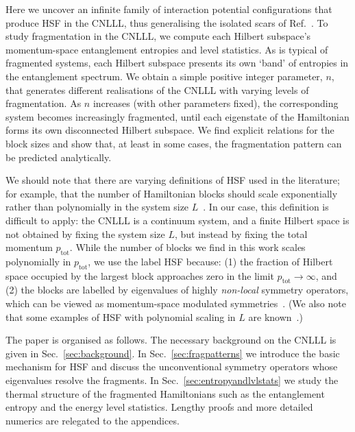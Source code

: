 \documentclass[aps,prx,10pt,twocolumn,amsmath,amssymb,superscriptaddress]{revtex4-2}
\newcommand{\ptot}{p_{\mathrm{tot}}}
\theoremstyle{definition}
\theoremstyle{definition}
\begin{document}
Here we uncover an infinite family of interaction potential configurations that produce HSF in the CNLLL, thus generalising the isolated scars of Ref.~. To study fragmentation in the CNLLL, we compute each Hilbert subspace's momentum-space entanglement entropies and level statistics. As is typical of fragmented systems, each Hilbert subspace presents its own `band' of entropies in the entanglement spectrum. We obtain a simple positive integer parameter, $n$, that generates different realisations of the CNLLL with varying levels of fragmentation. As $n$ increases (with other parameters fixed), the corresponding system becomes increasingly fragmented, until each eigenstate of the Hamiltonian forms its own disconnected Hilbert subspace. We find explicit relations for the block sizes and show that, at least in some cases, the fragmentation pattern can be predicted analytically.

We should note that there are varying definitions of HSF used in the literature; for example, that the number of Hamiltonian blocks should scale exponentially rather than polynomially in the system size $L$~\cite{PhysRevX.12.011050}. In our case, this definition is difficult to apply: the CNLLL is a continuum system, and a finite Hilbert space is not obtained by fixing the system size $L$, but instead by fixing the total momentum $\ptot$. While the number of blocks we find in this work scales polynomially in $\ptot$, we use the label HSF because: (1) the fraction of Hilbert space occupied by the largest block approaches zero in the limit $\ptot \rightarrow \infty$, and (2) the blocks are labelled by eigenvalues of highly \emph{non-local} symmetry operators, which can be viewed as momentum-space modulated symmetries~\cite{Sala22modulated}. (We also note that some examples of HSF with polynomial scaling in $L$ are known~\cite{Arijeet22weakfragmentation}.)

The paper is organised as follows. The necessary background on the CNLLL is given in Sec.~\ref{sec:background}. In Sec.~\ref{sec:fragpatterns} we introduce the basic mechanism for HSF and discuss the unconventional symmetry operators whose eigenvalues resolve the fragments. In Sec.~\ref{sec:entropyandlvlstats} we study the thermal structure of the fragmented Hamiltonians such as the entanglement entropy and the energy level statistics. Lengthy proofs and more detailed numerics are relegated to the appendices.
\end{document}
